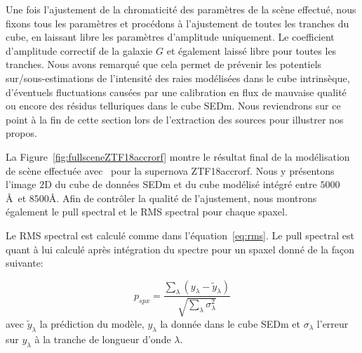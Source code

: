 \documentclass[../main/main.tex]{subfiles}
\begin{document}
Une fois l'ajustement de la chromaticité des paramètres de la scène
effectué, nous fixons tous les paramètres et procédons à l'ajustement
de toutes les tranches du cube, en laissant libre les paramètres
d'amplitude uniquement. Le coefficient d'amplitude correctif de la galaxie $G$ et
également laissé libre pour toutes les tranches. Nous avons remarqué que cela
permet de prévenir les
potentiels sur/sous-estimations de l'intensité des raies modélisées dans
le cube intrinsèque, d'éventuels fluctuations causées par une
calibration en flux de mauvaise qualité ou encore des résidus
telluriques dans le cube SEDm. Nous reviendrons sur ce point à la fin de
cette section lors de l'extraction des sources pour illustrer nos propos.

La Figure~\ref{fig:fullsceneZTF18accrorf} montre le résultat final de la
modélisation de scène effectuée avec \hypergal\ pour la supernova
ZTF18accrorf. Nous y présentons l'image 2D du cube de données SEDm et du cube
modélisé intégré entre $5000$\AA\ et $8500$\AA. Afin de contrôler la
qualité de l'ajustement, nous montrons également le pull spectral et le
RMS spectral pour chaque spaxel.

Le RMS spectral est calculé comme dans l'équation~\ref{eq:rms}. Le
pull spectral est quant à lui calculé après intégration du spectre pour
un spaxel donné de la façon suivante:

\begin{equation}
  \label{eq:pullspectral}
  p_{spx}=\frac{\sum\limits_{\lambda}\left( y_{\lambda}-\widetilde{y}_{\lambda}\right)}{\sqrt{\sum\limits_{\lambda}\sigma_{\lambda}^{2}}}
\end{equation}
avec $\widetilde{y}_{\lambda}$ la prédiction du modèle, $y_{\lambda}$ la donnée dans le cube
SEDm et $\sigma_{\lambda}$ l'erreur sur $y_{\lambda}$ à la tranche de
longueur d'onde $\lambda$.
\end{document}
